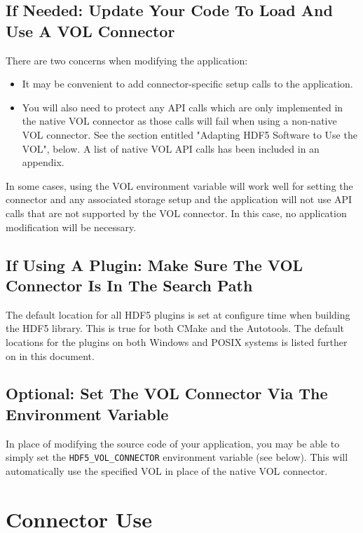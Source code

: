 \subsection{If Needed: Update Your Code To Load And Use A VOL Connector}

There are two concerns when modifying the application:

\begin{itemize}
    \item It may be convenient to add connector-specific setup calls to the application.

    \item You will also need to protect any API calls which are only implemented in the native VOL connector as those calls will fail when using a non-native VOL connector. See the section entitled "Adapting HDF5 Software to Use the VOL", below. A list of native VOL API calls has been included in an appendix.
\end{itemize}

In some cases, using the VOL environment variable will work well for setting the connector and any associated storage setup and the application will not use API calls that are not supported by the VOL connector. In this case, no application modification will be necessary.

\subsection{If Using A Plugin: Make Sure The VOL Connector Is In The Search Path}

The default location for all HDF5 plugins is set at configure time when building the HDF5 library. This is true for both CMake and the Autotools. The default locations for the plugins on both Windows and POSIX systems is listed further on in this document.

\subsection{Optional: Set The VOL Connector Via The Environment Variable}

In place of modifying the source code of your application, you may be able to simply set the {\tt HDF5\_VOL\_CONNECTOR} environment variable (see below). This will automatically use the specified VOL in place of the native VOL connector.

\section{Connector Use}

